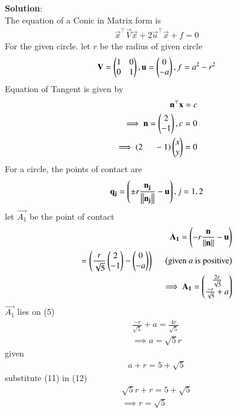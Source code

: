 \documentclass[journal]{IEEEtran}
\begin{document}
\textbf{Solution}:\\
The equation of a Conic in Matrix form is
\begin{align}
\vec{x}^\top\vec{V}\vec{x} + 2\vec{u}^\top\vec{x} + f = 0
\end{align}
For the given circle. let $r$ be the radius of given circle 
\begin{align}
    \mathbf{V}=\begin{pmatrix}
        1 & 0\\
        0 & 1
    \end{pmatrix},\mathbf{u}=\begin{pmatrix}0\\-a\end{pmatrix},f=a^2-r^2
\end{align}
Equation of Tangent is given by
\begin{align}
    \mathbf{n}^\top\mathbf{x}=c\\
    \implies \mathbf{n}=\begin{pmatrix}2\\-1\end{pmatrix} ,c=0\\
    \implies \left(2\hspace{0.5cm}-1\right)\begin{pmatrix}x\\y\end{pmatrix}=0
\end{align}
For a circle, the points of contact are
\begin{align}
    \mathbf{q_{j}}=\left(\pm r \frac{\mathbf{n_j}}{\left\lVert\mathbf{n_j}\right\rVert}-\mathbf{u}\right),j=1,2
\end{align}
let $\vec{A_1}$ be the point of contact
\begin{align}
    \mathbf{A_1}=\left(-r \frac{\mathbf{n}}{\left\lVert\mathbf{n}\right\rVert}-\mathbf{u}\right)\\
    =\left(\frac{r}{\sqrt{5}}\begin{pmatrix}2\\-1\end{pmatrix}-\begin{pmatrix}0\\-a\end{pmatrix}\right) \hspace{0.5cm} \left(\text{given }a \text{ is positive}\right)\\
    \implies \mathbf{A_1}=\begin{pmatrix}\frac{2r}{\sqrt{5}}\\ \frac{-r}{\sqrt{5}}+a\end{pmatrix}
\end{align}
$\vec{A_1}$ lies on (5) 
\begin{align}
    \frac{-r}{\sqrt{5}} + a=\frac{4r}{\sqrt{5}}\\
    \implies a=\sqrt{5}r
\end{align}
given 
\begin{align}
a + r = 5 + \sqrt{5}
\end{align}
substitute (11) in (12)
\begin{align}
\sqrt{5}r +r =5 +\sqrt{5}\\
    \implies r=\sqrt{5}
\end{align}
\end{document}

